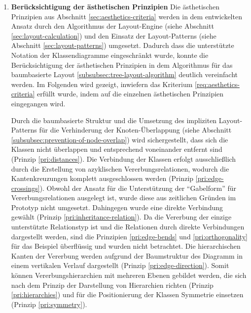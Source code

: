 \begin{enumerate}[label={K.\arabic*}]
\item
\label{eval:aesthetics-criteria}
\textbf{Berücksichtigung der ästhetischen Prinzipien}
Die ästhetischen Prinzipien aus Abschnitt \ref{sec:aesthetics-criteria} werden in dem entwickelten Ansatz durch den Algorithmus der Layout-Engine (siehe Abschnitt \ref{sec:layout-calculation}) und den Einsatz der Layout-Patterns (siehe Abschnitt \ref{sec:layout-patterns}) umgesetzt. Dadurch dass die unterstützte Notation der Klassendiagramme eingeschränkt wurde, konnte die Berücksichtigung der ästhetischen Prinzipien in dem Algorithmus für das baumbasierte Layout \ref{subsubsec:tree-layout-algorithm} deutlich vereinfacht werden. Im Folgenden wird gezeigt, inwiefern das Kriterium \ref{req:aesthetics-criteria} erfüllt wurde, indem auf die einzelnen ästhetischen Prinzipien eingegangen wird.

Durch die baumbasierte Struktur und die Umsetzung des impliziten Layout-Patterns für die Verhinderung der Knoten-Überlappung (siehe Abschnitt \ref{subsubsec:prevention-of-node-overlap}) wird sichergestellt, dass sich die Klassen nicht überlappen und entsprechend voneinander entfernt sind (Prinzip \ref{pri:distances}). Die Verbindung der Klassen erfolgt ausschließlich durch die Erstellung von azyklischen Vererbungsrelationen, wodurch die Kantenkreuzungen komplett ausgeschlossen werden (Prinzip \ref{pri:edge-crossings}). Obwohl der Ansatz für die Unterstützung der \enquote{Gabelform} für Vererbungsrelationen ausgelegt ist, wurde diese aus zeitlichen Gründen im Prototyp nicht umgesetzt. Dahingegen wurde eine direkte Verbindung gewählt (Prinzip \ref{pri:inheritance-relation}). Da die Vererbung der einzige unterstützte Relationstyp ist und die Relationen durch direkte Verbindungen dargestellt werden, sind die Prinzipien \ref{pri:edge-bends} und \ref{pri:orthogonality} für das Beispiel überflüssig und wurden nicht betrachtet. Die hierarchischen Kanten der Vererbung werden aufgrund der Baumstruktur des Diagramm in einem vertikalen Verlauf dargestellt (Prinzip \ref{pri:edge-direction}). Somit können Vererbungshierarchien mit mehreren Ebenen gebildet werden, die sich nach dem Prinzip der Darstellung von Hierarchien richten (Prinzip \ref{pri:hierarchies}) und für die Positionierung der Klassen Symmetrie einsetzen (Prinzip \ref{pri:symmetry}).


\end{enumerate}
